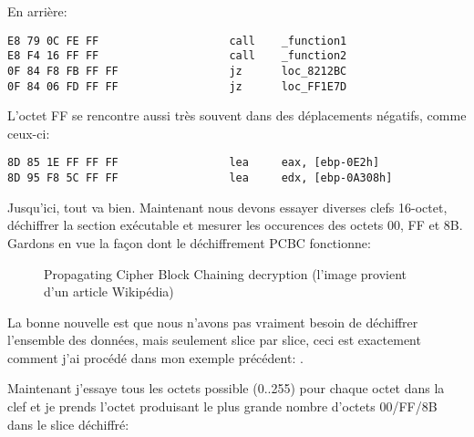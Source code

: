 En arrière:

\begin{lstlisting}[style=customasmx86]
E8 79 0C FE FF                    call    _function1
E8 F4 16 FF FF                    call    _function2
0F 84 F8 FB FF FF                 jz      loc_8212BC
0F 84 06 FD FF FF                 jz      loc_FF1E7D
\end{lstlisting}

L'octet FF se rencontre aussi très souvent dans des déplacements négatifs, comme
ceux-ci:

\begin{lstlisting}[style=customasmx86]
8D 85 1E FF FF FF                 lea     eax, [ebp-0E2h]
8D 95 F8 5C FF FF                 lea     edx, [ebp-0A308h]
\end{lstlisting}

Jusqu'ici, tout va bien. Maintenant nous devons essayer diverses clefs 16-octet, déchiffrer
la section exécutable et mesurer les occurences des octets 00, FF et 8B.
Gardons en vue la façon dont le déchiffrement PCBC fonctionne:

\begin{figure}[H]
\centering
{}
\caption{Propagating Cipher Block Chaining decryption (l'image provient d'un article Wikipédia)}
\end{figure}

La bonne nouvelle est que nous n'avons pas vraiment besoin de déchiffrer l'ensemble
des données, mais seulement slice par slice, ceci est exactement comment j'ai procédé
dans mon exemple précédent: .

Maintenant j'essaye tous les octets possible (0..255) pour chaque octet dans la clef
et je prends l'octet produisant le plus grande nombre d'octets 00/FF/8B dans le slice
déchiffré:


